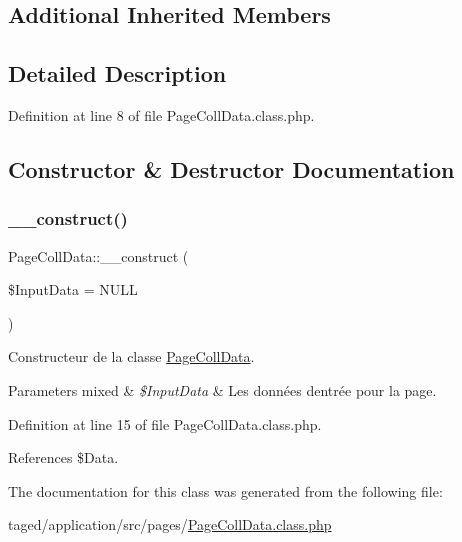 \subsection*{Additional Inherited Members}


\subsection{Detailed Description}


Definition at line 8 of file Page\+Coll\+Data.\+class.\+php.



\subsection{Constructor \& Destructor Documentation}
\mbox{\label{class_page_coll_data_a4bb7eb0355f3cc6d73bcf76345174cc4}} 
\subsubsection{\texorpdfstring{\+\_\+\+\_\+construct()}{\_\_construct()}}
{\footnotesize\ttfamily Page\+Coll\+Data\+::\+\_\+\+\_\+construct (\begin{DoxyParamCaption}\item[{}]{\$\+Input\+Data = {\ttfamily NULL} }\end{DoxyParamCaption})}

Constructeur de la classe \hyperlink{class_page_coll_data}{Page\+Coll\+Data}.


\begin{DoxyParams}[1]{Parameters}
mixed & {\em \$\+Input\+Data} & Les données d\textquotesingle{}entrée pour la page. \\
\hline
\end{DoxyParams}


Definition at line 15 of file Page\+Coll\+Data.\+class.\+php.



References \$\+Data.



The documentation for this class was generated from the following file\+:\begin{DoxyCompactItemize}
\item 
taged/application/src/pages/\hyperlink{_page_coll_data_8class_8php}{Page\+Coll\+Data.\+class.\+php}\end{DoxyCompactItemize}
